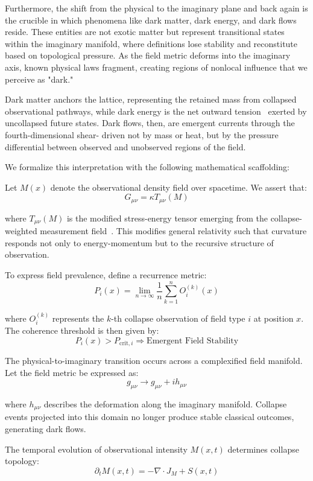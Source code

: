 Furthermore, the shift from the physical to the imaginary plane and back again is the crucible in which phenomena like dark matter, dark energy, and dark flows reside. These entities are not exotic matter but represent transitional states within the imaginary manifold, where definitions lose stability and reconstitute based on topological pressure. As the field metric deforms into the imaginary axis, known physical laws fragment, creating regions of nonlocal influence that we perceive as "dark."

Dark matter anchors the lattice, representing the retained mass from collapsed observational pathways, while dark energy is the net outward tension~\cite{riess1998observational} exerted by uncollapsed future states. Dark flows, then, are emergent currents through the fourth-dimensional shear- driven not by mass or heat, but by the pressure differential between observed and unobserved regions of the field.

We formalize this interpretation with the following mathematical scaffolding:

Let $M(x)$ denote the observational density field over spacetime. We assert that:
\[ G_{\mu\nu} = \kappa T_{\mu\nu}(M) \]

where $T_{\mu\nu}(M)$ is the modified stress-energy tensor emerging from the collapse-weighted measurement field~\cite{gisin2014collapse}. This modifies general relativity such that curvature responds not only to energy-momentum but to the recursive structure of observation.

To express field prevalence, define a recurrence metric:
\[ P_i(x) = \lim_{n \to \infty} \frac{1}{n} \sum_{k=1}^{n} O_i^{(k)}(x) \]

where $O_i^{(k)}$ represents the $k$-th collapse observation of field type $i$ at position $x$. The coherence threshold is then given by:
\[ P_i(x) > P_{\text{crit}, i} \Rightarrow \text{Emergent Field Stability} \]

The physical-to-imaginary transition occurs across a complexified field manifold. Let the field metric be expressed as:
\[ g_{\mu\nu} \to g_{\mu\nu} + i h_{\mu\nu} \]

where $h_{\mu\nu}$ describes the deformation along the imaginary manifold. Collapse events projected into this domain no longer produce stable classical outcomes, generating dark flows.

The temporal evolution of observational intensity $M(x,t)$ determines collapse topology:
\[ \partial_t M(x,t) = -\nabla \cdot J_M + S(x,t) \]

